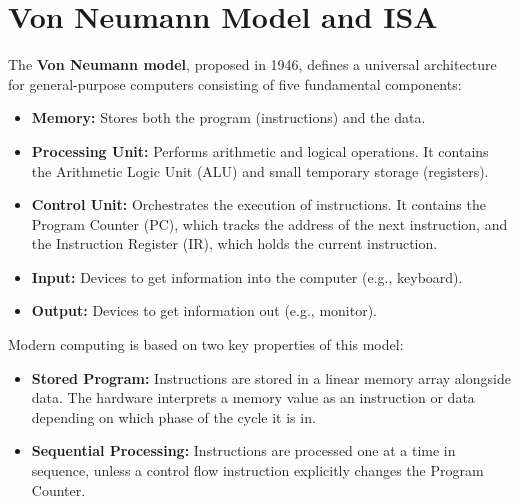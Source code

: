 \section{Von Neumann Model and ISA}

\begin{definition}
The \textbf{Von Neumann model}, proposed in 1946, defines a universal architecture for general-purpose computers consisting of five fundamental components:
\begin{itemize}
    \item \textbf{Memory:} Stores both the program (instructions) and the data.
    \item \textbf{Processing Unit:} Performs arithmetic and logical operations. It contains the Arithmetic Logic Unit (ALU) and small temporary storage (registers).
    \item \textbf{Control Unit:} Orchestrates the execution of instructions. It contains the Program Counter (PC), which tracks the address of the next instruction, and the Instruction Register (IR), which holds the current instruction.
    \item \textbf{Input:} Devices to get information into the computer (e.g., keyboard).
    \item \textbf{Output:} Devices to get information out (e.g., monitor).
\end{itemize}
\end{definition}

\begin{important}
Modern computing is based on two key properties of this model:
\begin{itemize}
    \item \textbf{Stored Program:} Instructions are stored in a linear memory array alongside data. The hardware interprets a memory value as an instruction or data depending on which phase of the cycle it is in.
    \item \textbf{Sequential Processing:} Instructions are processed one at a time in sequence, unless a control flow instruction explicitly changes the Program Counter.
\end{itemize}
\end{important}

